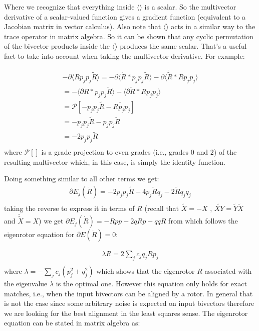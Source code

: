 \documentclass{birkjour}
\numberwithin{equation}{section}
\begin{document}
Where we recognize that everything inside $\langle \rangle$ is a scalar. So the multivector derivative of a scalar-valued function gives a gradient function (equivalent to a Jacobian matrix in vector calculus). Also note that $\langle \rangle$ acts in a similar way to the trace operator in matrix algebra. So it can be shown that any cyclic permutation of the bivector products inside the $\langle \rangle$ produces the same scalar. That's a useful fact to take into account when taking the multivector derivative. For example:

\begin{eqnarray}
	-\partial \langle R p_j p_j \tilde R\rangle = -\partial \langle \dot R * p_j p_j \tilde R\rangle - \partial \langle \dot{\tilde R} * R p_j p_j\rangle \nonumber\\
	= -\langle \partial R * p_j p_j \tilde R\rangle - \langle \partial{\tilde R}  * R p_j p_j\rangle \nonumber\\
	= \mathcal P \left[ - p_j p_j \tilde R - \widetilde{R p_j p_j} \right] \nonumber\\
	= - p_j p_j \tilde R - p_j p_j \tilde R \nonumber\\
	= -2 p_j p_j \tilde R \nonumber\\
\end{eqnarray}
where $\mathcal{P} \left[ \right]$ is a grade projection to even grades (i.e., grades $0$ and $2$) of the resulting multivector which, in this case, is simply the identity function. 

Doing something similar to all other terms we get:
\begin{eqnarray}
	\label{eqn:multivector_derivative}
	\partial E_j(\dot R) = -2 p_j p_j \tilde R - 4 p_j \tilde R q_j - 2 \tilde R q_j q_j \nonumber\\
\end{eqnarray}
taking the reverse to express it in terms of $R$ (recall that $\tilde X = -X$ , $\widetilde{X Y} = \tilde Y \tilde X$ and $\tilde{\tilde X} = X$) we get $\partial E_j(\dot R) = - R p p - 2 q R p - q q R$ from which follows the eigenrotor equation for $\partial E(\dot R) = 0$:

\begin{eqnarray}
	\lambda R = 2 \sum_j { c_{j} q_j R p_j } \nonumber\\
\end{eqnarray}
where $\lambda = -\sum_j { c_{j} (p_j^2 + q_j^2) }$ which shows that the eigenrotor $R$ associated with the eigenvalue $\lambda$ is the optimal one. However this equation only holds for exact matches, i.e., when the input bivectors can be aligned by a rotor. In general that is not the case since some arbitrary noise is expected on input bivectors therefore we are looking for the best alignment in the least squares sense. The eigenrotor equation can be stated in matrix algebra as:
\end{document}

